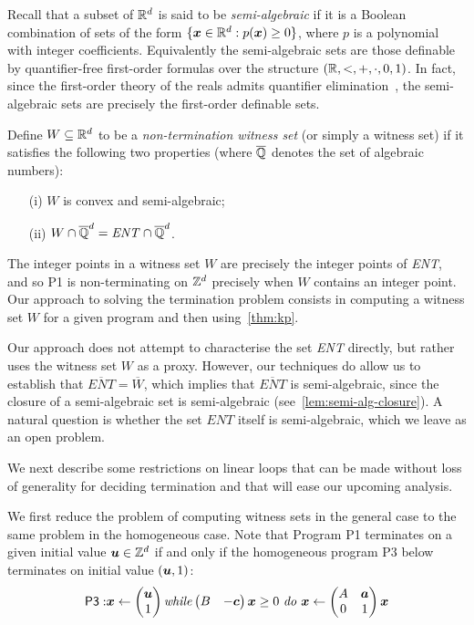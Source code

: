 Recall that a subset of $\mathbb{R}^{d}$ is said to be
\emph{semi-algebraic} if it is a Boolean combination of sets of the
form $\{ \boldsymbol{x} \in \mathbb{R}^{d} : p(\boldsymbol{x})\geq 0\}$,
where $p$ is a polynomial with integer coefficients.  Equivalently the
semi-algebraic sets are those definable by quantifier-free first-order
formulas over the structure $(\mathbb{R},<,+,\cdot,0,1)$.  In fact,
since the first-order theory of the reals admits quantifier
elimination~\cite{Tar51}, the semi-algebraic sets are precisely the
first-order definable sets.

Define $W \subseteq \mathbb{R}^{d}$ to be a
\emph{non-termination witness set} (or simply a witness set) if it
satisfies the following two properties (where $\overline{\mathbb{Q}}$ denotes the
set of algebraic numbers):
\begin{itemize}
\item[(i)] $W$ is convex and semi-algebraic;
\item[(ii)] $W\cap \overline{\mathbb{Q}}^{d}=\mathit{ENT}\cap \overline{\mathbb{Q}}^{d}$.
\end{itemize}

The integer points in a witness set $W$ are precisely the integer
points of \textit{ENT}, and so \textsf{P1} is non-terminating on
$\mathbb{Z}^{d}$ precisely when $W$ contains an integer point.  Our
approach to solving the termination problem consists in computing a
witness set $W$ for a given program and then using~\cref{thm:kp}.

Our approach does not attempt to characterise the set \textit{ENT}
directly, but rather uses the witness set $W$ as a proxy. However, our
techniques do allow us to establish that
$\overline{\mathit{ENT}}=\overline{W}$, which implies
that $\overline{\mathit{ENT}}$ is semi-algebraic, since the closure of
a semi-algebraic set is semi-algebraic (see~\cref{lem:semi-alg-closure}). A natural question is whether the set $ENT$
itself is semi-algebraic, which we leave as an open problem.

We next describe some restrictions on linear loops that can
be made without loss of generality for deciding termination
and that will ease our upcoming analysis.

We first reduce the problem of computing witness sets in the general
case to the same problem in the homogeneous case.  Note that Program
\textsf{P1} terminates on a given initial value $\boldsymbol{u}\in
\mathbb{Z}^{d}$ if and only if the homogeneous program \textsf{P3} below
terminates on initial value $(\boldsymbol{u}, 1)$:
\begin{align*}
\mathsf{P3:} \boldsymbol{x}\gets
\begin{pmatrix} \boldsymbol{u}\\ 1\end{pmatrix} \mbox{\textit{while}} \begin{pmatrix}B &-\boldsymbol{c} \end{pmatrix}
\boldsymbol{x} \geq 0 \mbox{ \textit{do} } \boldsymbol{x}\leftarrow
\begin{pmatrix}A&\boldsymbol{a}\\ 0 & 1
\end{pmatrix} \boldsymbol{x}
\end{align*}

